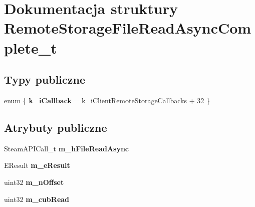 \hypertarget{struct_remote_storage_file_read_async_complete__t}{}\section{Dokumentacja struktury Remote\+Storage\+File\+Read\+Async\+Complete\+\_\+t}
\label{struct_remote_storage_file_read_async_complete__t}
\subsection*{Typy publiczne}
\begin{DoxyCompactItemize}
\item 
\mbox{\label{struct_remote_storage_file_read_async_complete__t_a1cb64492201198474e6d2b1a24166f70}} 
enum \{ {\bfseries k\+\_\+i\+Callback} = k\+\_\+i\+Client\+Remote\+Storage\+Callbacks + 32
 \}
\end{DoxyCompactItemize}
\subsection*{Atrybuty publiczne}
\begin{DoxyCompactItemize}
\item 
\mbox{\label{struct_remote_storage_file_read_async_complete__t_a140862c56c2325dd8fc4c55b4c1cbeda}} 
Steam\+A\+P\+I\+Call\+\_\+t {\bfseries m\+\_\+h\+File\+Read\+Async}
\item 
\mbox{\label{struct_remote_storage_file_read_async_complete__t_a5b401fdd11f9cca813ffc33977728369}} 
E\+Result {\bfseries m\+\_\+e\+Result}
\item 
\mbox{\label{struct_remote_storage_file_read_async_complete__t_af797b82a490dfca998f3f873c197f55b}} 
uint32 {\bfseries m\+\_\+n\+Offset}
\item 
\mbox{\label{struct_remote_storage_file_read_async_complete__t_a05904a01b5900d215a9cdcf18e52d2cc}} 
uint32 {\bfseries m\+\_\+cub\+Read}
\end{DoxyCompactItemize}


